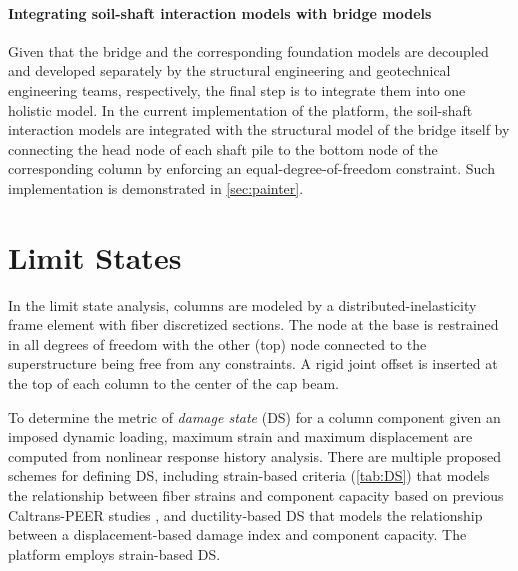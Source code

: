 \paragraph{Integrating soil-shaft interaction models with bridge models}
Given that the bridge and the corresponding foundation models are decoupled and developed separately by the structural engineering and geotechnical engineering teams, respectively, the final step is to integrate them into one holistic model. 
In the current implementation of the platform, the soil-shaft interaction models are integrated with the structural model of the bridge itself by connecting the head node of each shaft pile to the bottom node of the corresponding column by enforcing an equal-degree-of-freedom constraint. 
Such implementation is demonstrated in \cref{sec:painter}.

\fi 


\section{Limit States}

In the limit state analysis, columns are modeled by a 
distributed-inelasticity frame element with fiber discretized sections.
The node at the base is restrained in all degrees of freedom with the
other (top) node connected to the superstructure being free from any constraints. 
A rigid joint offset is inserted at the top of each column to the center of the cap beam.


To determine the metric of \emph{damage state} (DS) for a column component given an imposed dynamic loading, maximum strain and maximum displacement are computed from nonlinear response history analysis. 
There are multiple proposed schemes for defining DS, including strain-based criteria \cite{zhou2022capacitya} (\cref{tab:DS}) that models the relationship between fiber strains and component capacity based on previous Caltrans-PEER studies \citep{zhou2022capacitya}, and ductility-based DS \citep{saini2014probabilistic} that models the relationship between a displacement-based damage index and component capacity. 
The \gls{platform} employs strain-based DS.


